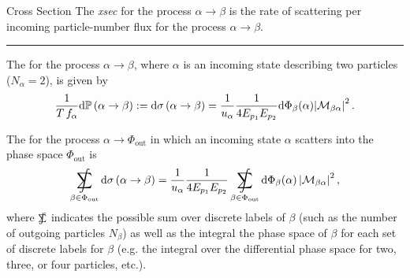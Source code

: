 \begin{definitionbox}{Cross Section}{}
    The \emph{\gls{xsec}} for the process \(\alpha \to \beta\) is the rate of scattering per incoming particle-number flux for the process \(\alpha \to \beta\).

    \vspace{7pt}
    \hrule
    \vspace{7pt}

    The  for the process \(\alpha \to \beta\), where \(\alpha\) is an incoming state describing two particles (\(N_\alpha = 2\)), is given by
    \begin{align}
        \label{eq:differential-xsec}
        \frac{1}{T\,f_\alpha}
        \dd \mathbb{P}\le(\alpha \to \beta\ri)
        :=
        \dd \sigma\le(\alpha \to \beta\ri)
        =
        \frac{1}{u_\alpha}
        \frac{1}{4 E_{p_1} E_{p_2}}
        \dd \Phi_\beta(\alpha)
        \abs{\mathcal{M}_{\beta\alpha}}^2
        \,.
    \end{align}

    The  for the process \(\alpha \to \Phi_\text{out}\) in which an incoming state \(\alpha\) scatters into the phase space \(\Phi_\text{out}\) is
    \begin{align}
        \label{eq:total-xsec}
        \SumInt_{\beta \in \Phi_\text{out}}
        \dd \sigma\le(\alpha \to \beta\ri)
        =
        \frac{1}{u_\alpha}
        \frac{1}{4 E_{p_1} E_{p_2}}
        \SumInt_{\beta \in \Phi_\text{out}}
        \dd \Phi_\beta(\alpha)
        \,
        \abs{\mathcal{M}_{\beta\alpha}}^2
        \,,
    \end{align}
    where \(\SumInt\) indicates the possible sum over discrete labels of \(\beta\) (such as the number of outgoing particles \(N_\beta\)) as well as the integral the phase space of \(\beta\) for each set of discrete labels for \(\beta\) (e.g. the integral over the differential phase space for two, three, or four particles, etc.).
\end{definitionbox}




